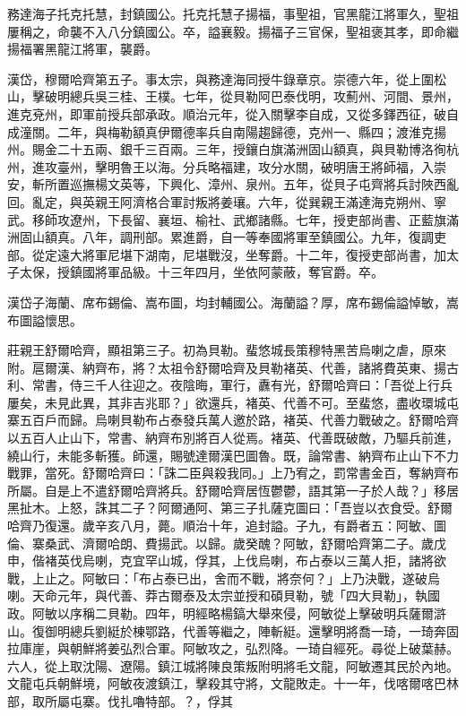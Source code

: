 \begin{pinyinscope}
務達海子托克托慧，封鎮國公。托克托慧子揚福，事聖祖，官黑龍江將軍久，聖祖屢稱之，命襲不入八分鎮國公。卒，謚襄毅。揚福子三官保，聖祖褒其孝，即命繼揚福署黑龍江將軍，襲爵。

漢岱，穆爾哈齊第五子。事太宗，與務達海同授牛錄章京。崇德六年，從上圍松山，擊破明總兵吳三桂、王樸。七年，從貝勒阿巴泰伐明，攻薊州、河間、景州，進克兗州，即軍前授兵部承政。順治元年，從入關擊李自成，又從多鐸西征，破自成潼關。二年，與梅勒額真伊爾德率兵自南陽趨歸德，克州一、縣四；渡淮克揚州。賜金二十五兩、銀千三百兩。三年，授鑲白旗滿洲固山額真，與貝勒博洛徇杭州，進攻臺州，擊明魯王以海。分兵略福建，攻分水關，破明唐王將師福，入崇安，斬所置巡撫楊文英等，下興化、漳州、泉州。五年，從貝子屯齊將兵討陜西亂回。亂定，與英親王阿濟格合軍討叛將姜瓖。六年，從巽親王滿達海克朔州、寧武。移師攻遼州，下長留、襄垣、榆社、武鄉諸縣。七年，授吏部尚書、正藍旗滿洲固山額真。八年，調刑部。累進爵，自一等奉國將軍至鎮國公。九年，復調吏部。從定遠大將軍尼堪下湖南，尼堪戰沒，坐奪爵。十二年，復授吏部尚書，加太子太保，授鎮國將軍品級。十三年四月，坐依阿蒙蔽，奪官爵。卒。

漢岱子海蘭、席布錫倫、嵩布圖，均封輔國公。海蘭謚？厚，席布錫倫謚悼敏，嵩布圖謚懷思。

莊親王舒爾哈齊，顯祖第三子。初為貝勒。蜚悠城長策穆特黑苦烏喇之虐，原來附。扈爾漢、納齊布，將？太祖令舒爾哈齊及貝勒褚英、代善，諸將費英東、揚古利、常書，侍三千人往迎之。夜陰晦，軍行，纛有光，舒爾哈齊曰：「吾從上行兵屢矣，未見此異，其非吉兆耶？」欲還兵，褚英、代善不可。至蜚悠，盡收環城屯寨五百戶而歸。烏喇貝勒布占泰發兵萬人邀於路，褚英、代善力戰破之。舒爾哈齊以五百人止山下，常書、納齊布別將百人從焉。褚英、代善既破敵，乃驅兵前進，繞山行，未能多斬獲。師還，賜號達爾漢巴圖魯。既，論常書、納齊布止山下不力戰罪，當死。舒爾哈齊曰：「誅二臣與殺我同。」上乃宥之，罰常書金百，奪納齊布所屬。自是上不遣舒爾哈齊將兵。舒爾哈齊居恆鬱鬱，語其第一子於人哉？」移居黑扯木。上怒，誅其二子？阿爾通阿、第三子扎薩克圖曰：「吾豈以衣食受。舒爾哈齊乃復還。歲辛亥八月，薨。順治十年，追封謚。子九，有爵者五：阿敏、圖倫、寨桑武、濟爾哈朗、費揚武。以歸。歲癸醜？阿敏，舒爾哈齊第二子。歲戊申，偕褚英伐烏喇，克宜罕山城，俘其，上伐烏喇，布占泰以三萬人拒，諸將欲戰，上止之。阿敏曰：「布占泰已出，舍而不戰，將奈何？」上乃決戰，遂破烏喇。天命元年，與代善、莽古爾泰及太宗並授和碩貝勒，號「四大貝勒」，執國政。阿敏以序稱二貝勒。四年，明經略楊鎬大舉來侵，阿敏從上擊破明兵薩爾滸山。復御明總兵劉綎於棟鄂路，代善等繼之，陣斬綎。還擊明將喬一琦，一琦奔固拉庫崖，與朝鮮將姜弘烈合軍。阿敏攻之，弘烈降。一琦自經死。尋從上破葉赫。六人，從上取沈陽、遼陽。鎮江城將陳良策叛附明將毛文龍，阿敏遷其民於內地。文龍屯兵朝鮮境，阿敏夜渡鎮江，擊殺其守將，文龍敗走。十一年，伐喀爾喀巴林部，取所屬屯寨。伐扎嚕特部。？，俘其


\end{pinyinscope}
